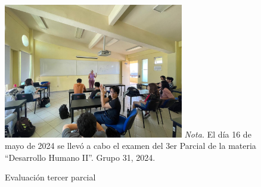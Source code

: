 \begin{figure}
    \caption{Evaluaci\'on tercer parcial\label{fig:No.6}}
    \includegraphics[width=0.7\textwidth]{./assets/img/imagen6DH.jpeg}
	\textit{Nota.} El d\'ia 16 de mayo de 2024 se llev\'o a cabo el examen del 3er Parcial de la materia ``Desarrollo Humano II''. Grupo 31, 2024.
\end{figure}
